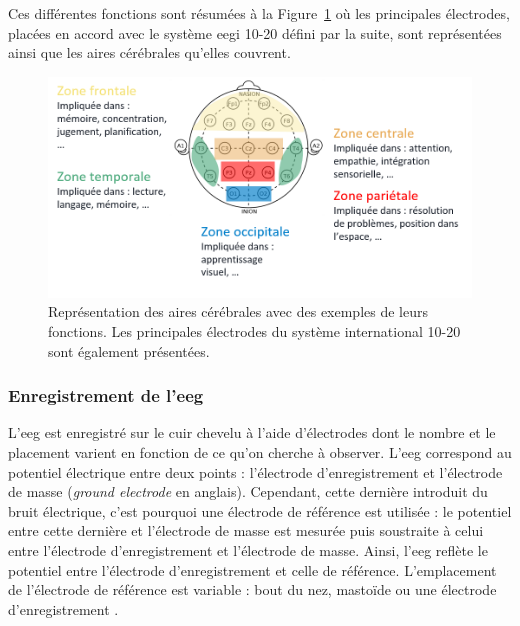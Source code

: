 Ces différentes fonctions sont résumées à la Figure~\ref{Figure:introduction_cortical_areas_and_functions} où les principales électrodes, placées en accord avec le système \gls{eegi} 10-20 
défini par la suite, sont représentées ainsi que les aires cérébrales qu'elles couvrent. 

\begin{figure}[h!]
  \centering
	\includegraphics[width=1\linewidth]{figures/chapter-1/introduction-cortical-areas-and-functions} 
  \caption[Représentation des aires cérébrales avec des exemples de leurs fonctions.]{Représentation des aires cérébrales avec des exemples de leurs fonctions. 
	Les principales électrodes du système international 10-20 sont également présentées.}
  \label{Figure:introduction_cortical_areas_and_functions}
\end{figure}

\subsubsection{Enregistrement de l'\gls{eeg}}

L'\gls{eeg} est enregistré sur le cuir chevelu à l'aide d'électrodes dont le nombre et le placement varient en fonction de ce qu'on cherche à observer. L'\gls{eeg} correspond
au potentiel électrique entre deux points : l'électrode d'enregistrement et l'électrode de masse (\textit{ground electrode} en anglais). Cependant, cette dernière introduit
du bruit électrique, c'est pourquoi une électrode de référence est utilisée : le potentiel entre cette dernière et l'électrode de masse est mesurée puis soustraite à celui entre
l'électrode d'enregistrement et l'électrode de masse. Ainsi, l'\gls{eeg} reflète le potentiel entre l'électrode d'enregistrement et celle
de référence. L'emplacement de l'électrode de référence est variable : bout du nez, mastoïde ou une électrode d'enregistrement \citep{Michel2004}.

